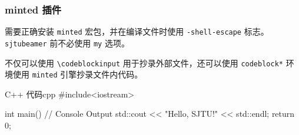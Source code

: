 \documentclass{ctexbeamer}
\begin{document}
\begin{frame}[fragile]  %
  \frametitle{minted 插件}
  需要正确安装 \texttt{minted} 宏包，并在编译文件时使用 \texttt{-shell-escape} 标志。\texttt{sjtubeamer} 前不必使用 \texttt{my} 选项。
\end{frame}
\begin{frame}[fragile]
  不仅可以使用 \texttt{\textbackslash{}codeblockinput} 用于抄录外部文件，还可以使用 \texttt{codeblock*} 环境使用 \texttt{minted} 引擎抄录文件内代码。
\end{frame}
\begin{frame}[fragile]  %
  \begin{codeblock*}[]{C++ 代码}{cpp}
    #include<iostream>

    int main(){
        // Console Output
        std::cout << "Hello, SJTU!" << std::endl;
        return 0;
      }       \end{codeblock*}
\end{frame}
\end{document}
